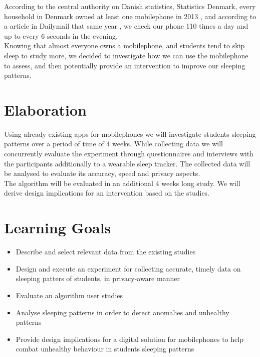 \documentclass[12pt]{article}
\begin{document}
According to the central authority on Danish statistics, Statistics Denmark, every household in 
Denmark owned at least one mobilephone in 2013 \cite{DanmarksStatistik2013}, and according 
to a article in Dailymail that same year \cite{Woollaston2013}, we check our phone 110 times a 
day and up to every 6 seconds in the evening. \\

Knowing that almost everyone owns a mobilephone, and students tend to skip sleep to study more,
we decided to investigate how we can use the mobilephone to assess, and then potentially provide an intervention to improve our sleeping patterns. 

\section{Elaboration}
Using already existing apps for mobilephones we will investigate students sleeping patterns over a 
period of time of 4 weeks. While collecting data we will concurrently evaluate the experiment through 
questionnaires and interviews with the participants additionally to a wearable sleep tracker. The collected data will be analysed to evaluate its accuracy, speed and privacy aspects. \\

The algorithm will be evaluated in an additional 4 weeks long study. We will derive design implications for an intervention based on the studies. 

\section{Learning Goals}
	\begin{itemize}
		\item Describe and select relevant data from the existing studies
		\item Design and execute an experiment for collecting accurate, timely data on sleeping patters of students, in privacy-aware manner
		\item Evaluate an algorithm user studies
		\item Analyse sleeping patterns in order to detect anomalies and unhealthy patterns 
		\item Provide design implications for a digital solution for mobilephones to help combat unhealthy behaviour in students sleeping patterns
	\end{itemize}
	
\end{document}
